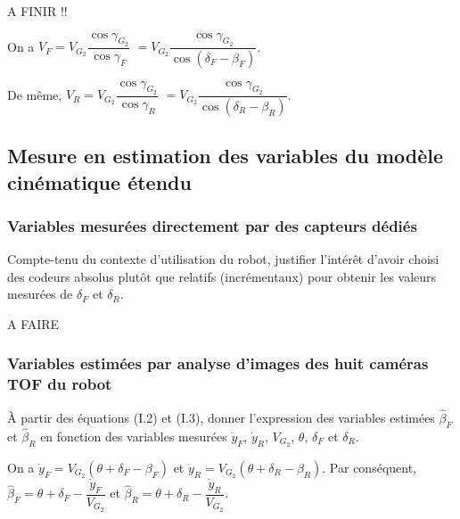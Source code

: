 \documentclass[11pt]{article}
\begin{document}
\begin{UPSTIcorrige}
A FINIR !!

On a $V_{F}  =V_{G_2} \dfrac{\cos \gamma_{G_2}}{\cos \gamma_{F}}$ $=V_{G_2} \dfrac{\cos \gamma_{G_2}}{\cos  \left(\delta_F-\beta_F \right)}$. 

De même, $V_{R}  =V_{G_2} \dfrac{\cos \gamma_{G_2}}{\cos \gamma_{R}}$ $=V_{G_2} \dfrac{\cos \gamma_{G_2}}{\cos  \left(\delta_R-\beta_R \right)}$. 
\end{UPSTIcorrige}


\subsection{Mesure en estimation des variables du modèle cinématique étendu}


\subsubsection{Variables mesurées directement par des capteurs dédiés}

\UPSTIquestion Compte-tenu du contexte d'utilisation du robot, justifier l'intérêt d'avoir choisi des codeurs absolus
plutôt que relatifs (incrémentaux) pour obtenir les valeurs mesurées de $\delta_F$ et $\delta_R$.

\begin{UPSTIcorrige}
A FAIRE
\end{UPSTIcorrige}

\subsubsection{Variables estimées par analyse d'images des huit caméras TOF du robot}

\UPSTIquestion À partir des équations (I.2) et (I.3), donner l'expression des variables estimées $\hat{\beta}_F$
et $\hat{\beta}_R$ en fonction des variables mesurées $\dot{y}_F$, $\dot{y}_R$, $V_{G_2}$, $\theta$, $\delta_F$ et $\delta_R$.

\begin{UPSTIcorrige}
On a $\dot{y}_F =V_{G_2} \left(\theta + \delta_F - \beta_F\right)$ et $\dot{y}_R =V_{G_2} \left(\theta + \delta_R - \beta_R\right)$. Par conséquent, $\hat{\beta}_F =\theta + \delta_F-\dfrac{\dot{y}_F}{V_{G_2} }  $ et $\hat{\beta}_R =\theta + \delta_R-\dfrac{\dot{y}_R}{V_{G_2} }  $.
\end{UPSTIcorrige}
\end{document}
